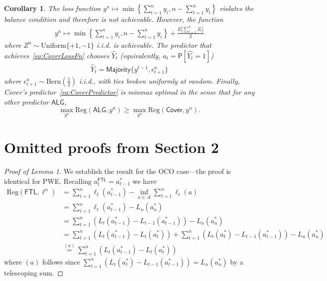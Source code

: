 \documentclass[twoside]{article}
\newtheorem{corollary}{Corollary}
\newcommand{\Unif}{\mathrm{Uniform}}
\newcommand{\e}{\epsilon}
\newcommand{\Reg}{\mathrm{Reg}}
\newcommand{\ftl}{\mathsf{FTL}}
\newcommand{\Ac}{\mathcal{A}}
\newcommand{\alg}{\mathsf{ALG}}
\newcommand{\aftl}{a^{\mathsf{FTL}}}
\newcommand{\Majority}{\mathsf{Majority}}
\newcommand{\Cover}{\mathsf{Cover}}
\begin{document}
\begin{corollary}\label{cor:BinPredOptReg}
    The loss function $y^n \mapsto \min\left\{\sum_{t=1}^n y_i, n-\sum_{t=1}^n y_i\right\}$ violates the balance condition and therefore is not achievable. However, the function 
    \begin{align}\label{eq:CoverLossFn}
    y^n \mapsto \min\left\{\sum_{t=1}^n y_i, n-\sum_{t=1}^n y_i\right\} + \frac{E|\sum_{t=1}^n Z_t|}{2}
    \end{align}
    where $Z^n \sim \Unif\{+1,-1\}$ i.i.d. is achievable. The predictor that achieves~\eqref{eq:CoverLossFn} chooses $\widehat{Y}_t$ (equivalently, $a_t = \mathsf{P}[\widehat{Y_t} = 1]$)
    \begin{align}\label{eq:CoverPredictor}
        \widehat{Y}_t = \Majority\{y^{t-1},\e_{t+1}^n\}
    \end{align} 
    where $\e_{t+1}^n \sim \mathrm{Bern}\left(\frac{1}{2}\right)$ i.i.d., with ties broken uniformly at random. Finally, Cover's predictor~\eqref{eq:CoverPredictor} is \emph{minmax optimal} in the sense that for any other predictor $\alg$, 
    \[
    \max_{y^n} \Reg(\alg, y^n) \ge \max_{y^n} \Reg(\Cover, y^n).
    \]
\end{corollary}




\section{Omitted proofs from Section 2}

\begin{proof}[Proof of Lemma 1]
    We establish the result for the OCO case---the proof is identical for PWE. Recalling $\aftl_t = a^*_{t-1}$ we have 
    \begin{align*}
        \Reg(\ftl, \ell^n) &= \sum_{t=1}^n \ell_t(a^*_{t-1})  - \inf_{a \in \Ac} \sum_{t=1}^n \ell_t(a) \\
        &= \sum_{t=1}^n \ell_t(a^*_{t-1})  - L_n(a^*_n) \\
        &= \sum_{t=1}^n (L_t(a^*_{t-1}) - L_{t-1}(a^*_{t-1})) -  L_n(a^*_n) \\
        &= \sum_{t=1}^n (L_t(a^*_{t-1}) - L_t(a^*_t)) + \sum_{t=1}^n (L_t(a^*_t) - L_{t-1}(a^*_{t-1})) - L_n(a^*_n) \\
        &\stackrel{(a)}{=} \sum_{t=1}^n (L_t(a^*_{t-1}) - L_t(a^*_t))
    \end{align*}
    where $(a)$ follows since $\sum_{t=1}^n (L_t(a^*_t) - L_{t-1}(a^*_{t-1})) = L_n(a^*_n)$ by a telescoping sum. 
\end{proof}
\end{document}
